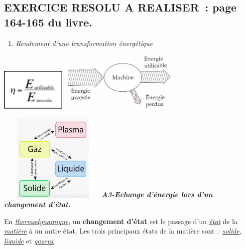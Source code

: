 \subsection{EXERCICE RESOLU A REALISER~: page 164-165 du livre.}

\begin{enumerate}
\item
  \emph{Rendement d'une transformation énergétique }
\end{enumerate}

\includegraphics[width=3.108cm,height=2.073cm]{Pictures/10000001000000500000003510F712318EAE4AA8.png}\includegraphics[width=5.95cm,height=2.896cm]{Pictures/100000010000046C00000226BB542474620E0092.png}

\includegraphics[width=5.184cm,height=4.166cm]{Pictures/10000001000001D9000002050D0008DD07AA637E.png}\emph{\textbf{A3-Echange
d'énergie lors d'un changement d'état. }}

En
\href{https://fr.wikipedia.org/wiki/Thermodynamique}{\emph{\emph{thermodynamique}}},
un \textbf{changement d'état} est le passage d'un
\href{https://fr.wikipedia.org/wiki/\%C3\%89tat_de_la_mati\%C3\%A8re}{\emph{\emph{état}}}
de la
\href{https://fr.wikipedia.org/wiki/Mati\%C3\%A8re}{\emph{\emph{matière}}}
à un autre état. Les trois principaux états de la matière sont~:
\href{https://fr.wikipedia.org/wiki/\%C3\%89tat_solide}{\emph{\emph{solide}}},
\href{https://fr.wikipedia.org/wiki/Liquide}{\emph{\emph{liquide}}} et
\href{https://fr.wikipedia.org/wiki/Gaz}{\emph{\emph{gazeux}}}.

